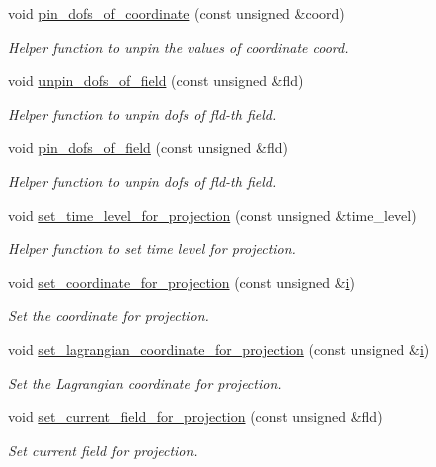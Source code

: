 \begin{DoxyCompactItemize}
void \hyperlink{classoomph_1_1ProjectionProblem_ade05dce90814098ec0af15324b758730}{pin\+\_\+dofs\+\_\+of\+\_\+coordinate} (const unsigned \&coord)
\begin{DoxyCompactList}\small\item\em Helper function to unpin the values of coordinate coord. \end{DoxyCompactList}\item 
void \hyperlink{classoomph_1_1ProjectionProblem_a36847f48bff4081b5db0c038ddba1260}{unpin\+\_\+dofs\+\_\+of\+\_\+field} (const unsigned \&fld)
\begin{DoxyCompactList}\small\item\em Helper function to unpin dofs of fld-\/th field. \end{DoxyCompactList}\item 
void \hyperlink{classoomph_1_1ProjectionProblem_acff96fd0e3dda445ba806e253988c547}{pin\+\_\+dofs\+\_\+of\+\_\+field} (const unsigned \&fld)
\begin{DoxyCompactList}\small\item\em Helper function to unpin dofs of fld-\/th field. \end{DoxyCompactList}\item 
void \hyperlink{classoomph_1_1ProjectionProblem_a935983de617d4fb2feeef674af13d473}{set\+\_\+time\+\_\+level\+\_\+for\+\_\+projection} (const unsigned \&time\+\_\+level)
\begin{DoxyCompactList}\small\item\em Helper function to set time level for projection. \end{DoxyCompactList}\item 
void \hyperlink{classoomph_1_1ProjectionProblem_ad8f93fb7e51a0e427b634d4dac8e96a3}{set\+\_\+coordinate\+\_\+for\+\_\+projection} (const unsigned \&\hyperlink{cfortran_8h_adb50e893b86b3e55e751a42eab3cba82}{i})
\begin{DoxyCompactList}\small\item\em Set the coordinate for projection. \end{DoxyCompactList}\item 
void \hyperlink{classoomph_1_1ProjectionProblem_a944bed6fe67a6e683d3c7eb242705b6e}{set\+\_\+lagrangian\+\_\+coordinate\+\_\+for\+\_\+projection} (const unsigned \&\hyperlink{cfortran_8h_adb50e893b86b3e55e751a42eab3cba82}{i})
\begin{DoxyCompactList}\small\item\em Set the Lagrangian coordinate for projection. \end{DoxyCompactList}\item 
void \hyperlink{classoomph_1_1ProjectionProblem_a616f08ea08e8f1ba6be018e966f38830}{set\+\_\+current\+\_\+field\+\_\+for\+\_\+projection} (const unsigned \&fld)
\begin{DoxyCompactList}\small\item\em Set current field for projection. \end{DoxyCompactList}\end{DoxyCompactItemize}
